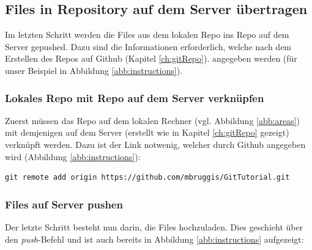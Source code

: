 \documentclass[twoside, 11pr]{article}
\begin{document}
\subsection{Files in Repository auf dem Server übertragen}\label{ch:push}

Im letzten Schritt werden die Files aus dem lokalen Repo ins Repo auf dem Server gepushed. Dazu sind die Informationen erforderlich, welche nach dem Erstellen des Repos auf Github (Kapitel \ref{ch:gitRepo}). angegeben werden (für unser Beispiel in Abbildung \ref{abb:instructions}).

\begin{figure}[!tbph]
\end{figure}

\subsubsection{Lokales Repo mit Repo auf dem Server verknüpfen}

Zuerst müssen das Repo auf dem lokalen Rechner (vgl. Abbildung \ref{abb:areas}) mit demjenigen auf dem Server (erstellt wie in Kapitel \ref{ch:gitRepo} gezeigt) verknüpft werden. Dazu ist der Link notwenig, welcher durch Github angegeben wird (Abbildung \ref{abb:instructions}):

\begin{lstlisting}
git remote add origin https://github.com/mbruggis/GitTutorial.git
\end{lstlisting}

\subsubsection{Files auf Server pushen}
Der letzte Schritt besteht nun darin, die Files hochzuladen. Dies geschieht über den \textit{push}-Befehl und ist auch bereits in Abbildung \ref{abb:instructions} aufgezeigt:
\end{document}
